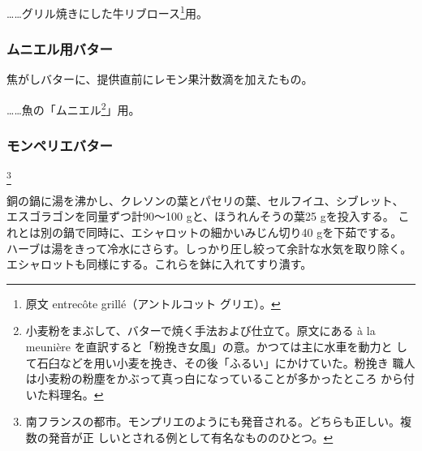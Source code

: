 \begin{recette}
\ldots{}\ldots{}グリル焼きにした牛リブロース\footnote{原文 entrecôte
  grillé（アントルコット グリエ）。}用。

\maeaki

\hypertarget{beurre-a-la-meuniere}{%
\subsubsection{ムニエル用バター}\label{beurre-a-la-meuniere}}



焦がしバターに、提供直前にレモン果汁数滴を加えたもの。

\ldots{}\ldots{}魚の「ムニエル\footnote{小麦粉をまぶして、バターで焼く手法および仕立て。原文にある
  à la meunière を直訳すると「粉挽き女風」の意。かつては主に水車を動力と
  して石臼などを用い小麦を挽き、その後「ふるい」にかけていた。粉挽き
  職人は小麦粉の粉塵をかぶって真っ白になっていることが多かったところ
  から付いた料理名。}」用。

\maeaki

\hypertarget{beurre-de-montpellier}{%
\subsubsection{モンペリエバター}\label{beurre-de-montpellier}}

\footnote{南フランスの都市。モンプリエのようにも発音される。どちらも正しい。複数の発音が正
  しいとされる例として有名なもののひとつ。}


銅の鍋に湯を沸かし、クレソンの葉とパセリの葉、セルフイユ、シブレット、
エスゴラゴンを同量ずつ計90〜100 gと、ほうれんそうの葉25 gを投入する。
これとは別の鍋で同時に、エシャロットの細かいみじん切り40 gを下茹でする。
ハーブは湯をきって冷水にさらす。しっかり圧し絞って余計な水気を取り除く。
エシャロットも同様にする。これらを鉢に入れてすり潰す。


\end{recette}
